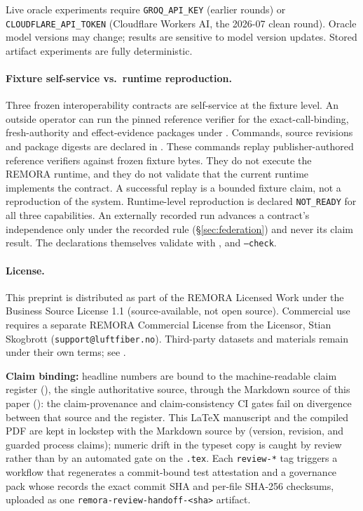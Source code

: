 \documentclass[10pt,twocolumn]{article}
\begin{document}
Live oracle experiments require \texttt{GROQ\_API\_KEY} (earlier rounds)
or \texttt{CLOUDFLARE\_API\_TOKEN} (Cloudflare Workers AI, the 2026-07
clean round). Oracle model versions may change; results are sensitive to
model version updates. Stored artifact experiments are fully deterministic.

\paragraph{Fixture self-service vs.\ runtime reproduction.}
Three frozen interoperability contracts are self-service at the fixture
level. An outside operator can run the pinned reference verifier for the
exact-call-binding, fresh-authority and effect-evidence packages under
. Commands, source revisions and package
digests are declared in .
These commands replay publisher-authored reference verifiers against
frozen fixture bytes. They do not execute the REMORA runtime, and they
do not validate that the current runtime implements the contract. A
successful replay is a bounded fixture claim, not a reproduction of the
system. Runtime-level reproduction is declared \texttt{NOT\_READY} for
all three capabilities. An externally recorded run advances a contract's
independence only under the recorded rule (\S\ref{sec:federation}) and
never its claim result. The declarations themselves validate with
,
 and
 \texttt{--check}.

\paragraph{License.}
This preprint is distributed as part of the REMORA Licensed Work under
the Business Source License 1.1 (source-available, not open source).
Commercial use requires a separate REMORA Commercial License from the
Licensor, Stian Skogbrott (\texttt{support@luftfiber.no}). Third-party
datasets and materials remain under their own terms; see
.

\textbf{Claim binding:} headline numbers are bound to the machine-readable
claim register (), the single
authoritative source, through the Markdown source of this paper
(): the claim-provenance and claim-consistency
CI gates fail on divergence between that source and the register. This
LaTeX manuscript and the compiled PDF are kept in lockstep with the
Markdown source by  (version, revision,
and guarded process claims); numeric drift in the typeset copy is caught by
review rather than by an automated gate on the \texttt{.tex}. Each \texttt{review-*}
tag triggers a workflow that regenerates a commit-bound test attestation
and a governance pack whose  records the exact commit
SHA and per-file SHA-256 checksums, uploaded as one
\texttt{remora-review-handoff-<sha>} artifact.
\end{document}
